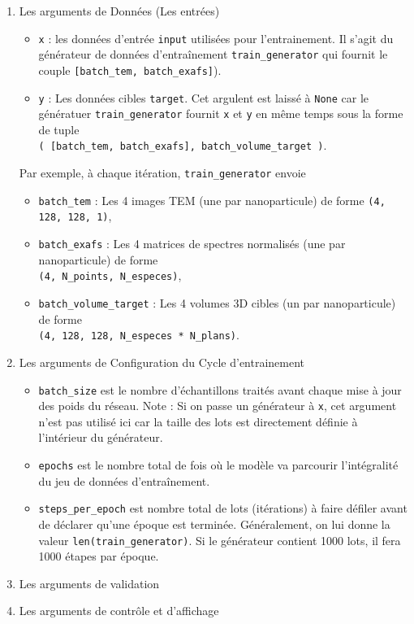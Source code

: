 \documentclass[12pt,a4paper,french]{book}
\begin{document}
\begin{enumerate}
	\item Les arguments de Données (Les entrées)
	\begin{itemize}
		\item \verb+x+ : les données d'entrée \verb+input+ utilisées pour l'entrainement. Il s'agit du générateur de données d'entraînement \verb+train_generator+ qui fournit le couple \verb+[batch_tem, batch_exafs]+).
		\item \verb+y+ : Les données cibles \verb+target+. Cet argulent est laissé à \verb+None+ car le génératuer \verb+train_generator+ fournit \verb+x+ et \verb+y+ en même temps sous la forme de tuple \\ \verb+( [batch_tem, batch_exafs], batch_volume_target )+.
	\end{itemize}
	Par exemple, à chaque itération, \verb+train_generator+ envoie
	\begin{itemize}
		\item \verb+batch_tem+ : Les 4 images TEM (une par nanoparticule) de forme \verb+(4, 128, 128, 1)+,
		\item \verb+batch_exafs+ : Les 4 matrices de spectres normalisés (une par nanoparticule) de forme\\ \verb+(4, N_points, N_especes)+,
		\item \verb+batch_volume_target+ : Les 4 volumes 3D cibles (un par nanoparticule) de forme\\ \verb+(4, 128, 128, N_especes * N_plans)+.
	\end{itemize}
	\item Les arguments de Configuration du Cycle d'entrainement
	\begin{itemize}
		\item \verb+batch_size+ est le nombre d'échantillons traités avant chaque mise à jour des poids du réseau.	Note : Si on passe un générateur à \verb+x+, cet argument n'est pas utilisé ici car la taille des lots est directement définie à l'intérieur du générateur.
		\item \verb+epochs+ est le nombre total de fois où le modèle va parcourir l'intégralité du jeu de données d'entraînement.
		\item \verb+steps_per_epoch+ est nombre total de lots (itérations) à faire défiler avant de déclarer qu'une époque est terminée. Généralement, on lui donne la valeur \verb+len(train_generator)+. Si le générateur contient 1000 lots, il fera 1000 étapes par époque.
	\end{itemize}
	\item Les arguments de validation
	\item Les arguments de contrôle et d'affichage
\end{enumerate}
\end{document}
